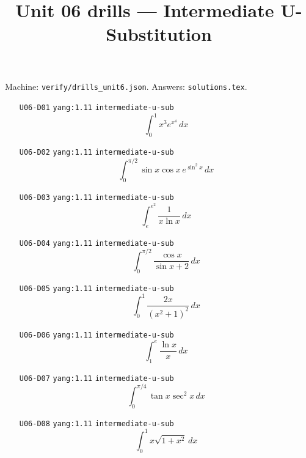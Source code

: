 
\title{Unit 06 drills --- Intermediate U-Substitution}
\author{}
\date{}

\maketitle
\noindent Machine: \texttt{verify/drills\_unit6.json}. Answers: \texttt{solutions.tex}.
\begin{enumerate}
\item[\texttt{U06-D01}] \texttt{yang:1.11} \texttt{intermediate-u-sub}
\[ \int_0^1 x^3 e^{x^4}\,dx \]
\item[\texttt{U06-D02}] \texttt{yang:1.11} \texttt{intermediate-u-sub}
\[ \int_0^{\pi/2} \sin x\cos x\, e^{\sin^2 x}\,dx \]
\item[\texttt{U06-D03}] \texttt{yang:1.11} \texttt{intermediate-u-sub}
\[ \int_e^{e^2} \frac{1}{x\ln x}\,dx \]
\item[\texttt{U06-D04}] \texttt{yang:1.11} \texttt{intermediate-u-sub}
\[ \int_0^{\pi/2} \frac{\cos x}{\sin x+2}\,dx \]
\item[\texttt{U06-D05}] \texttt{yang:1.11} \texttt{intermediate-u-sub}
\[ \int_0^1 \frac{2x}{(x^2+1)^2}\,dx \]
\item[\texttt{U06-D06}] \texttt{yang:1.11} \texttt{intermediate-u-sub}
\[ \int_1^e \frac{\ln x}{x}\,dx \]
\item[\texttt{U06-D07}] \texttt{yang:1.11} \texttt{intermediate-u-sub}
\[ \int_0^{\pi/4} \tan x\sec^2 x\,dx \]
\item[\texttt{U06-D08}] \texttt{yang:1.11} \texttt{intermediate-u-sub}
\[ \int_0^1 x\sqrt{1+x^2}\,dx \]
\end{enumerate}

